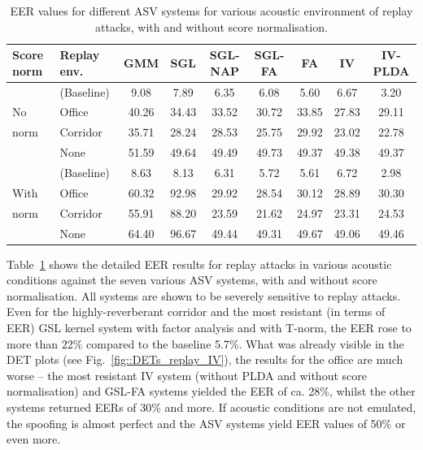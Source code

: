 \begin{table}
\begin{center}
    \begin{tabular}{ l l || c c c c c c c}
    \hline
Score norm & Replay env. &  GMM & SGL & SGL-NAP  & SGL-FA & FA & IV & IV-PLDA \\ 

 \hline \hline
& (Baseline) & 9.08 & 7.89 & 6.35 & 6.08 & 5.60 & 6.67 & 3.20\\
No & Office  & 40.26 & 34.43 & 33.52 & 30.72 & 33.85 & 27.83 & 29.11\\
norm & Corridor & 35.71 & 28.24 & 28.53 & 25.75 & 29.92 & 23.02 & 22.78\\
& None & 51.59 & 49.64 & 49.49 & 49.73 & 49.37 & 49.38 & 49.37\\
\hline
& (Baseline) & 8.63 & 8.13 & 6.31 & 5.72 & 5.61 & 6.72 & 2.98\\
With & Office  & 60.32 & 92.98 & 29.92 & 28.54 & 30.12 & 28.89 & 30.30\\
norm & Corridor & 55.91 & 88.20 & 23.59 & 21.62 & 24.97 & 23.31 & 24.53\\
& None & 64.40 & 96.67 & 49.44 & 49.31 & 49.67 & 49.06 & 49.46\\
\hline
    \end{tabular}
    \caption{EER values for different ASV systems for various acoustic environment of replay attacks, with and without score normalisation. }
		\label{tab::results_EER}
   \end{center}
\end{table}


Table~\ref{tab::results_EER} shows the detailed EER results for replay attacks in various acoustic conditions against the seven various ASV systems, with and without score normalisation. All systems are shown to be severely sensitive to replay attacks. Even for the highly-reverberant corridor and the most resistant (in terms of EER) GSL kernel system with factor analysis and with T-norm, the EER rose to more than 22\% compared to the baseline 5.7\%. What was already visible in the DET plots (see Fig.~\ref{fig::DETs_replay_IV}), the results for the office are much worse -- the most resistant IV system (without PLDA and without score normalisation) and GSL-FA systems yielded the EER of ca. 28\%, whilst the other systems returned EERs of 30\% and more. If acoustic conditions are not emulated, the spoofing is almost perfect and the ASV systems yield EER values of 50\% or even more. 


